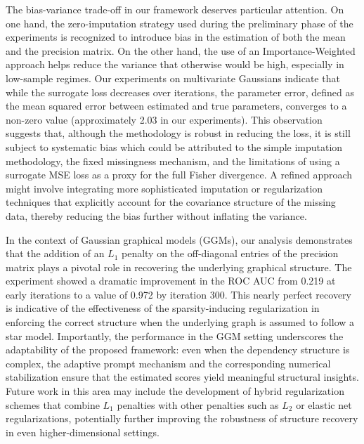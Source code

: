 \documentclass{article} %
\begin{document}
The bias-variance trade-off in our framework deserves particular attention. On one hand, the zero-imputation strategy used during the preliminary phase of the experiments is recognized to introduce bias in the estimation of both the mean and the precision matrix. On the other hand, the use of an Importance-Weighted approach helps reduce the variance that otherwise would be high, especially in low-sample regimes. Our experiments on multivariate Gaussians indicate that while the surrogate loss decreases over iterations, the parameter error, defined as the mean squared error between estimated and true parameters, converges to a non-zero value (approximately 2.03 in our experiments). This observation suggests that, although the methodology is robust in reducing the loss, it is still subject to systematic bias which could be attributed to the simple imputation methodology, the fixed missingness mechanism, and the limitations of using a surrogate MSE loss as a proxy for the full Fisher divergence. A refined approach might involve integrating more sophisticated imputation or regularization techniques that explicitly account for the covariance structure of the missing data, thereby reducing the bias further without inflating the variance.

In the context of Gaussian graphical models (GGMs), our analysis demonstrates that the addition of an \(L_1\) penalty on the off-diagonal entries of the precision matrix plays a pivotal role in recovering the underlying graphical structure. The experiment showed a dramatic improvement in the ROC AUC from 0.219 at early iterations to a value of 0.972 by iteration 300. This nearly perfect recovery is indicative of the effectiveness of the sparsity-inducing regularization in enforcing the correct structure when the underlying graph is assumed to follow a star model. Importantly, the performance in the GGM setting underscores the adaptability of the proposed framework: even when the dependency structure is complex, the adaptive prompt mechanism and the corresponding numerical stabilization ensure that the estimated scores yield meaningful structural insights. Future work in this area may include the development of hybrid regularization schemes that combine \(L_1\) penalties with other penalties such as \(L_2\) or elastic net regularizations, potentially further improving the robustness of structure recovery in even higher-dimensional settings.
\end{document}
